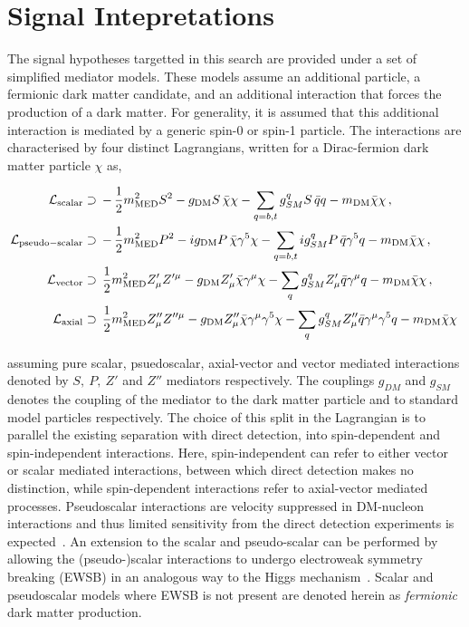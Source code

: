 \section{Signal Intepretations}
The signal hypotheses targetted in this search are provided under a set of simplified mediator models. These models assume an additional particle, 
a fermionic dark matter candidate, and an additional interaction that forces the production of a dark matter. 
For generality, it is assumed that this additional interaction is mediated by a generic spin-0 or spin-1 particle. 
The interactions are characterised by four distinct Lagrangians, written for a Dirac-fermion dark matter particle $\chi$ as, 

\begin{align}
\label{eq:LS} 
\mathcal{L}_{\mathrm{scalar}}&\supset\, -\,\frac{1}{2}m_{\rm MED}^2 S^2 - g_{\rm DM}  S \, \bar{\chi}\chi
 - \sum_{q=b,t} g_{SM}^q S \, \bar{q}q  - m_{\rm DM} \bar{\chi}\chi \,,
 \\
 \label{eq:LP} 
\mathcal{L}_{\rm{pseudo-scalar}}&\supset\, -\,\frac{1}{2}m_{\rm MED}^2 P^2 - i g_{\rm DM}  P \, \bar{\chi} \gamma^5\chi
 -\sum_{q=b,t}  i g_{SM}^q  P \, \bar{q}  \gamma^5q  - m_{\rm DM} \bar{\chi}\chi\,,
 \\
 \label{eq:LV} 
\mathcal{L}_{\mathrm{vector}}&\supset \, \frac{1}{2}m_{\rm MED}^2 Z'_{\mu} Z'^{\mu} - g_{\rm DM}Z'_{\mu} \bar{\chi}\gamma^{\mu}\chi -\sum_q g_{SM}^q Z'_{\mu} \bar{q}\gamma^{\mu}q - m_{\rm DM} \bar{\chi}\chi\,,
 \\
 \label{eq:LA} 
\mathcal{L}_{\rm{axial}}&\supset\,  \frac{1}{2}m_{\rm MED}^2 Z''_{\mu} Z''^{\mu} - g_{\rm DM} Z''_{\mu} \bar{\chi}\gamma^{\mu}\gamma^5\chi -\sum_q g_{SM}^q Z''_{\mu} \bar{q}\gamma^{\mu}\gamma^5q - m_{\rm DM} \bar{\chi}\chi\,
\end{align}

assuming pure scalar, psuedoscalar, axial-vector and vector mediated interactions denoted by $S,~P,~Z'$ and $Z''$ mediators respectively. 
The couplings $g_{DM}$ and $g_{SM}$ denotes the coupling of the mediator to the dark matter particle and to standard model particles respectively. 
The choice of this split in the Lagrangian is to parallel the existing separation with direct detection, into spin-dependent and spin-independent interactions. 
Here, spin-independent can refer to either vector or scalar mediated interactions, between which direct detection makes no distinction, while 
spin-dependent interactions refer to axial-vector mediated processes. 
Pseudoscalar interactions are velocity suppressed in DM-nucleon interactions and thus limited sensitivity from the direct detection experiments is expected~\cite{Haisch:2012kf}. 
An extension to the scalar and pseudo-scalar can be performed by allowing the (pseudo-)scalar interactions to undergo electroweak symmetry breaking (EWSB) in an analogous way to 
the Higgs mechanism~\cite{Khoze:2015sra,Hambye:2013sna,Khoze:2014xha,Khoze:2014woa,Altmannshofer:2014vra,Carone:2013wla,Heikinheimo:2013fta}. Scalar and pseudoscalar models 
where EWSB is not present are denoted herein as \emph{fermionic} dark matter production.

